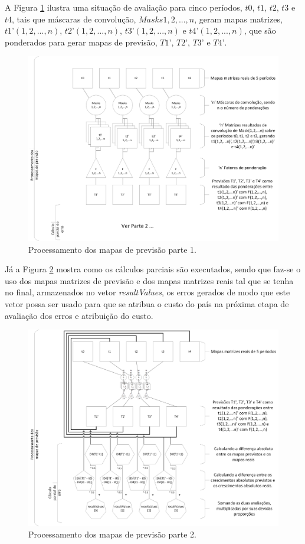 A Figura \ref{fig:ForecastEvalPart0}  ilustra uma situação de avaliação para cinco períodos, \(t0\), \(t1\), \(t2\), \(t3\) e \(t4\), tais que máscaras de convolução, \(Masks 1,2,...,n\), geram mapas matrizes, \(t1’(1,2,...,n)\), \(t2’(1,2,...,n)\), \(t3’(1,2,...,n)\) e \(t4’(1,2,...,n)\), que são ponderados para gerar mapas de previsão, \(T1’\), \(T2’\), \(T3’\) e \(T4’\).

\begin{figure}[h]
	\centering	\includegraphics[scale=0.55]{Figuras/Ilustrations-ForecastEvalPart0.png}
	\caption{Processamento dos mapas de previsão parte 1.}
	\label{fig:ForecastEvalPart0}
\end{figure}

Já a Figura \ref{fig:ForecastEvalPart1}  mostra como os cálculos parciais são executados, sendo que faz-se o uso dos mapas matrizes de previsão e dos mapas matrizes reais tal que se tenha no final, armazenados no vetor \emph{resultValues}, os erros gerados de modo que este vetor possa ser usado para que se atribua o custo do país na próxima etapa de avaliação dos erros e atribuição do custo.

\begin{figure}[h]
	\centering	\includegraphics[scale=0.55]{Figuras/Ilustrations-ForecastEvalPart1.png}
	\caption{Processamento dos mapas de previsão parte 2.}
	\label{fig:ForecastEvalPart1}
\end{figure}

